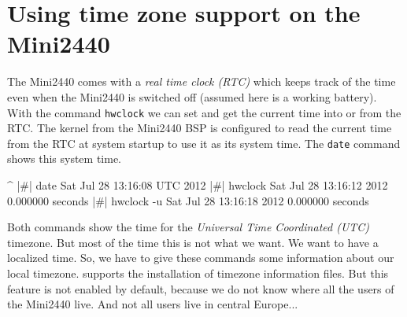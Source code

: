 %
%
%
%
%
%
%
\section{Using time zone support on the Mini2440}	\label{sec:timezone}

The Mini2440 comes with a \textit{real time clock (RTC)} which keeps track of
the time even when the Mini2440 is switched off (assumed here is a working
battery). With the command \texttt{hwclock} we can set and get the current
time into or from the RTC. The kernel from the Mini2440 BSP is configured to
read the current time from the RTC at system startup to use it as its system
time. The \texttt{date} command shows this system time.

\begin{ptxshell}[escapechar=|]{^}
|\#| date
Sat Jul 28 13:16:08 UTC 2012
|\#| hwclock
Sat Jul 28 13:16:12 2012  0.000000 seconds
|\#| hwclock -u
Sat Jul 28 13:16:18 2012  0.000000 seconds
\end{ptxshell}

Both commands show the time for the \textit{Universal Time Coordinated (UTC)}
timezone. But most of the time this is not what we want. We want to have a
localized time. So, we have to give these commands some information about our
local timezone. \ptxdist{} supports the installation of timezone information
files. But this feature is not enabled by default, because we do not know where
all the users of the Mini2440 live. And not all users live in central
Europe...

